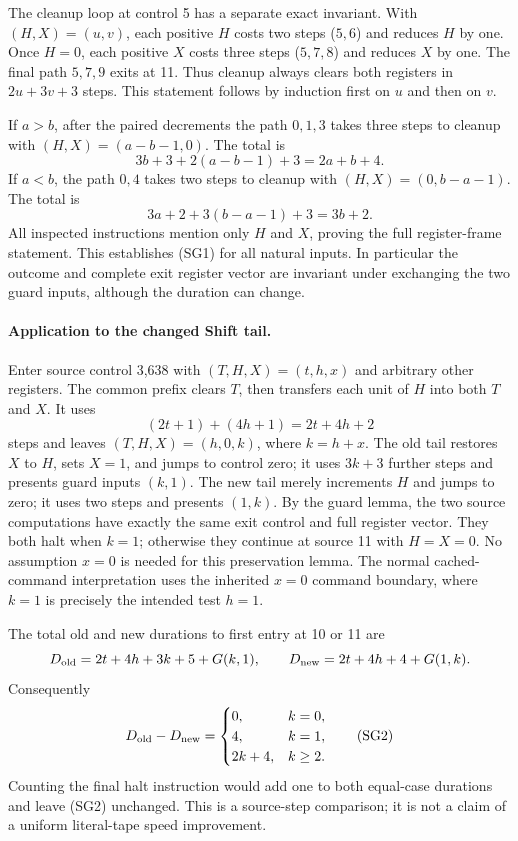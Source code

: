 The cleanup loop at control 5 has a separate exact invariant. With
$(H,X)=(u,v)$, each positive $H$ costs two steps ($5,6$) and reduces $H$
by one. Once $H=0$, each positive $X$ costs three steps ($5,7,8$) and
reduces $X$ by one. The final path $5,7,9$ exits at 11. Thus cleanup
always clears both registers in $2u+3v+3$ steps. This statement follows
by induction first on $u$ and then on $v$.

If $a>b$, after the paired decrements the path $0,1,3$ takes three
steps to cleanup with $(H,X)=(a-b-1,0)$. The total is
\[
3b+3+2(a-b-1)+3=2a+b+4.
\]
If $a<b$, the path $0,4$ takes two steps to cleanup with
$(H,X)=(0,b-a-1)$. The total is
\[
3a+2+3(b-a-1)+3=3b+2.
\]
All inspected instructions mention only $H$ and $X$, proving the full
register-frame statement. This establishes (SG1) for all natural inputs.
In particular the outcome and complete exit register vector are invariant
under exchanging the two guard inputs, although the duration can change.

\paragraph{Application to the changed Shift tail.}
Enter source control 3,638 with $(T,H,X)=(t,h,x)$ and arbitrary other
registers. The common prefix clears $T$, then transfers each unit of $H$
into both $T$ and $X$. It uses
\[
(2t+1)+(4h+1)=2t+4h+2
\]
steps and leaves $(T,H,X)=(h,0,k)$, where $k=h+x$.
The old tail restores $X$ to $H$, sets $X=1$, and jumps to control zero;
it uses $3k+3$ further steps and presents guard inputs $(k,1)$.
The new tail merely increments $H$ and jumps to zero; it uses two steps
and presents $(1,k)$. By the guard lemma, the two source computations
have exactly the same exit control and full register vector. They both
halt when $k=1$; otherwise they continue at source 11 with $H=X=0$.
No assumption $x=0$ is needed for this preservation lemma. The normal
cached-command interpretation uses the inherited $x=0$ command boundary,
where $k=1$ is precisely the intended test $h=1$.

The total old and new durations to first entry at 10 or 11 are
\[
D_{\rm old}=2t+4h+3k+5+G(k,1),\qquad
D_{\rm new}=2t+4h+4+G(1,k).
\]
Consequently
\[
D_{\rm old}-D_{\rm new}=
\begin{cases}
0,&k=0,\\
4,&k=1,\\
2k+4,&k\ge2.
\end{cases}
\tag{SG2}
\]
Counting the final halt instruction would add one to both equal-case
durations and leave (SG2) unchanged. This is a source-step comparison;
it is not a claim of a uniform literal-tape speed improvement.

